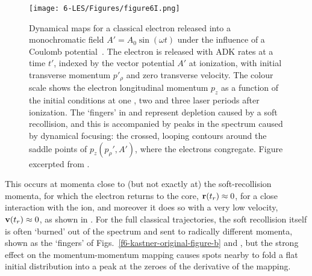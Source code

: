 \begin{figure}[htbp]
  \centering
  \subfigure{\label{f6-kastner-original-figure-a}}
  \subfigure{\label{f6-kastner-original-figure-b}}
  \subfigure{\label{f6-kastner-original-figure-c}}
  \subfigure{\label{f6-kastner-original-figure-d}}
  \texttt{[image: 6-LES/Figures/figure6I.png]}
  \caption[
  Dynamical maps for classical trajectories showing `finger'-like structures and the associated photoelectron bunching, as calculated by A. Kästner~et~al.
  ]{
  Dynamical maps for a classical electron released into a monochromatic field $A'=A_0\sin(\omega t)$ under the influence of a Coulomb potential~\cite{Rost_PRL}. The electron is released with ADK rates at a time $t'$, indexed by the vector potential $A'$ at ionization, with initial transverse momentum $p'_\rho$ and zero transverse velocity. The colour scale shows the electron longitudinal momentum $p_z$ as a function of the initial conditions at one \protect{}, two \protect{} and three \protect{} laser periods after ionization. The `fingers' in \protect{} and \protect{} represent depletion caused by a soft recollision, and this is accompanied by peaks in the spectrum \protect{} caused by dynamical focusing: the crossed, looping contours around the saddle points of $p_z(p_\rho',A')$, where the electrons congregate.
  Figure excerpted from .
  }
\label{f6-kastner-dynamical-focusing}
\end{figure}


This occurs at momenta close to (but not exactly at) the soft-recollision momenta, for which the electron returns to the core, $\vb{r}(t_r) \approx 0$, for a close interaction with the ion, and moreover it does so with a very low velocity, $\vb{v}(t_r)\approx 0$, as shown in . For the full classical trajectories, the soft recollision itself is often `burned' out of the spectrum and sent to radically different momenta, shown as the `fingers' of Figs.~\ref{f6-kastner-original-figure-b} and , but the strong effect on the momentum-momentum mapping causes spots nearby to fold a flat initial distribution into a peak at the zeroes of the derivative of the mapping.


